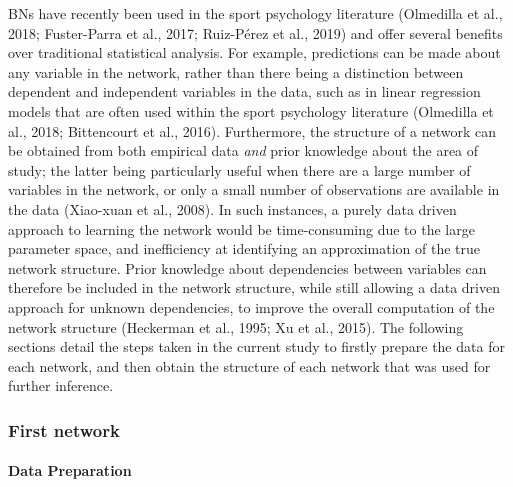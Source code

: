 \documentclass[
  english,
  man,floatsintext]{apa6}
\let\oldparagraph\paragraph
\renewcommand{\paragraph}[1]{\oldparagraph{#1}\mbox{}}
\begin{document}
BNs have recently been used in the sport psychology literature (Olmedilla et al., 2018; Fuster-Parra et al., 2017; Ruiz-Pérez et al., 2019) and offer several benefits over traditional statistical analysis.
For example, predictions can be made about any variable in the network, rather than there being a distinction between dependent and independent variables in the data, such as in linear regression models that are often used within the sport psychology literature (Olmedilla et al., 2018; Bittencourt et al., 2016).
Furthermore, the structure of a network can be obtained from both empirical data \emph{and} prior knowledge about the area of study; the latter being particularly useful when there are a large number of variables in the network, or only a small number of observations are available in the data (Xiao-xuan et al., 2008).
In such instances, a purely data driven approach to learning the network would be time-consuming due to the large parameter space, and inefficiency at identifying an approximation of the true network structure.
Prior knowledge about dependencies between variables can therefore be included in the network structure, while still allowing a data driven approach for unknown dependencies, to improve the overall computation of the network structure (Heckerman et al., 1995; Xu et al., 2015).
The following sections detail the steps taken in the current study to firstly prepare the data for each network, and then obtain the structure of each network that was used for further inference.

\hypertarget{first-network}{%
\subsubsection{First network}\label{first-network}}

\hypertarget{data-preparation}{%
\paragraph{Data Preparation}\label{data-preparation}}
\end{document}
